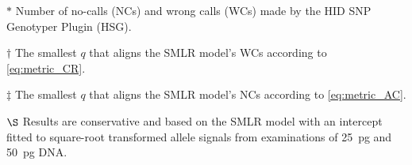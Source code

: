 \begin{table*}
\begin{adjustbox}{max width=\textwidth}
\begin{threeparttable}
\begin{tabular}{llrrrrrrrrrr}
   \bottomrule[2pt]
\end{tabular}
\begin{tablenotes}
\item[$*$] Number of no-calls (NCs) and wrong calls (WCs) made by the HID SNP Genotyper Plugin (HSG).
\item[$\dagger$] The smallest $q$ that aligns the SMLR model's WCs according to \eqref{eq:metric_CR}.
\item[$\ddagger$] The smallest $q$ that aligns the SMLR model's NCs according to \eqref{eq:metric_AC}.
\item[$\S$] Results are conservative and based on the SMLR model with an intercept fitted to square-root transformed allele signals from examinations of \SI{25}{\pg} and \SI{50}{\pg} DNA.
\end{tablenotes}
\end{threeparttable}
\end{adjustbox}
\end{table*}